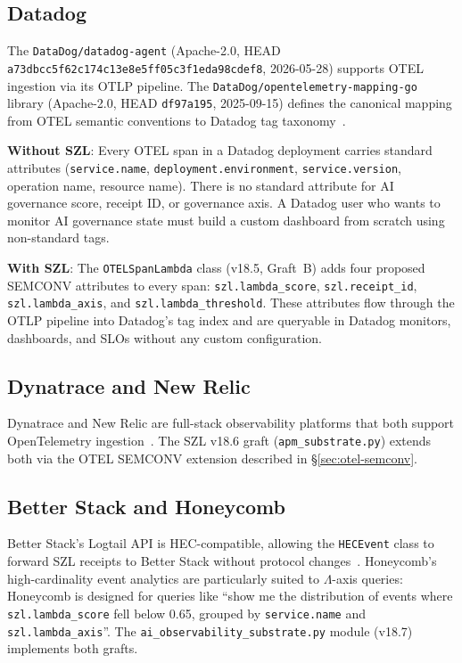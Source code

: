 \subsection{Datadog}
\label{ssec:datadog}

The \texttt{DataDog/datadog-agent} (Apache-2.0, HEAD
\texttt{a73dbcc5f62c174c13e8e5ff05c3f1eda98cdef8}, 2026-05-28) supports OTEL
ingestion via its OTLP pipeline.  The \texttt{DataDog/opentelemetry-mapping-go}
library (Apache-2.0, HEAD \texttt{df97a195}, 2025-09-15) defines the
canonical mapping from OTEL semantic conventions to Datadog tag
taxonomy~\cite{szl_observability_graft}.

\textbf{Without SZL}: Every OTEL span in a Datadog deployment carries
standard attributes (\texttt{service.name}, \texttt{deployment.environment},
\texttt{service.version}, operation name, resource name).  There is no
standard attribute for AI governance score, receipt ID, or governance axis.
A Datadog user who wants to monitor AI governance state must build a custom
dashboard from scratch using non-standard tags.

\textbf{With SZL}: The \texttt{OTELSpanLambda} class (v18.5, Graft~B) adds
four proposed SEMCONV attributes to every span: \texttt{szl.lambda\_score},
\texttt{szl.receipt\_id}, \texttt{szl.lambda\_axis}, and
\texttt{szl.lambda\_threshold}.  These attributes flow through the OTLP
pipeline into Datadog's tag index and are queryable in Datadog monitors,
dashboards, and SLOs without any custom configuration.

\subsection{Dynatrace and New Relic}
\label{ssec:dynatrace-newrelic}

Dynatrace and New Relic are full-stack observability platforms that both
support OpenTelemetry ingestion~\cite{dynatrace_newrelic_deep}.  The SZL
v18.6 graft (\texttt{apm\_substrate.py}) extends both via the OTEL SEMCONV
extension described in \S\ref{sec:otel-semconv}.

\subsection{Better Stack and Honeycomb}
\label{ssec:better-stack-honeycomb}

Better Stack's Logtail API is HEC-compatible, allowing the
\texttt{HECEvent} class to forward SZL receipts to Better Stack without
protocol changes~\cite{better_stack_honeycomb_deep}.  Honeycomb's
high-cardinality event analytics are particularly suited to $\Lambda$-axis
queries: Honeycomb is designed for queries like ``show me the distribution
of events where \texttt{szl.lambda\_score} fell below 0.65, grouped by
\texttt{service.name} and \texttt{szl.lambda\_axis}''.  The
\texttt{ai\_observability\_substrate.py} module (v18.7) implements both grafts.

